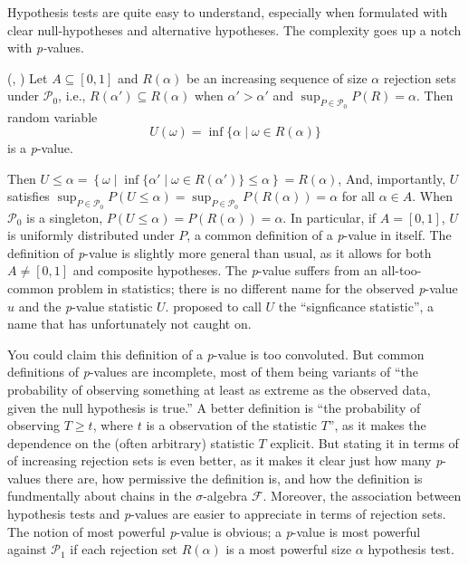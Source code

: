 Hypothesis tests are quite easy to understand, especially when formulated
with clear null-hypotheses and alternative hypotheses. The complexity
goes up a notch with \emph{p-}values.
\begin{definition}
\label{def:p-value}(\textcite[][Chapter 3.3]{Lehmann2005-sp}, \textcite{Bayarri2000-dt}) Let
$A\subseteq[0,1]$ and $R(\alpha)$ be an increasing sequence of size
$\alpha$ rejection sets under $\mathcal{P}_{0}$, i.e., $R(\alpha')\subseteq R(\alpha)$
when $\alpha'>\alpha'$ and $\sup_{P\in\mathcal{P}_{0}}P(R)=\alpha$.
Then random variable
\begin{equation}
U(\omega)=\inf\{\alpha\mid\omega\in R(\alpha)\}\label{eq:size p-value}
\end{equation}
is a \emph{p}-value. 
\end{definition}

Then $U\leq\alpha=\left\{ \omega\mid\inf\{\alpha'\mid\omega\in R(\alpha')\}\leq\alpha\right\} =R(\alpha)$,
And, importantly, $U$ satisfies $\sup_{P\in\mathcal{P}_{0}}P(U\leq\alpha)=\sup_{P\in\mathcal{P}_{0}}P(R(\alpha))=\alpha$
for all $\alpha\in A$. When $\mathcal{P}_{0}$ is a singleton, $P(U\leq\alpha)=P(R(\alpha))=\alpha$.
In particular, if $A=[0,1]$, $U$ is uniformly distributed under
$P$, a common definition of a \emph{p}-value in itself. The definition
of \emph{p}-value is slightly more general than usual, as it allows
for both $A\neq[0,1]$ and composite hypotheses. The \emph{p}-value
suffers from an all-too-common problem in statistics; there is no
different name for the observed \emph{p}-value $u$ and the \emph{p}-value
statistic $U$. \textcite{Schweder1988-nh} proposed to call $U$ the
``signficance statistic'', a name that has unfortunately not caught
on. 

You could claim this definition of a \emph{p}-value is too convoluted.
But common definitions of\emph{ p}-values are incomplete, most of
them being variants of ``the probability of observing something at
least as extreme as the observed data, given the null hypothesis is
true.'' A better definition is ``the probability of observing $T\geq t$,
where $t$ is a observation of the statistic $T$'', as it makes
the dependence on the (often arbitrary) statistic $T$ explicit. But
stating it in terms of of increasing rejection sets is even better,
as it makes it clear just how many \emph{p}-values there are, how
permissive the definition is, and how the definition is fundmentally
about chains in the $\sigma$-algebra $\mathcal{F}$. Moreover, the
association between hypothesis tests and \emph{p}-values are easier
to appreciate in terms of rejection sets. The notion of most powerful
\emph{p}-value is obvious; a \emph{p}-value is most powerful against
$\mathcal{P}_{1}$ if each rejection set $R(\alpha)$ is a most powerful
size $\alpha$ hypothesis test. 

